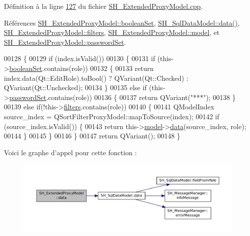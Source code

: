 Définition à la ligne \hyperlink{SH__ExtendedProxyModel_8cpp_source_l00127}{127} du fichier \hyperlink{SH__ExtendedProxyModel_8cpp_source}{S\-H\-\_\-\-Extended\-Proxy\-Model.\-cpp}.



Références \hyperlink{classSH__ExtendedProxyModel_a7dd9cf1dd153b98220d217e9be1f0916}{S\-H\-\_\-\-Extended\-Proxy\-Model\-::boolean\-Set}, \hyperlink{classSH__SqlDataModel_aa4664329d52c2d2cba2bacc42fa1a564}{S\-H\-\_\-\-Sql\-Data\-Model\-::data()}, \hyperlink{classSH__ExtendedProxyModel_a99a5c4c6b9d125c87f048c76d22278d3}{S\-H\-\_\-\-Extended\-Proxy\-Model\-::filters}, \hyperlink{classSH__ExtendedProxyModel_a8c8b8930c6b1abd9bbb1dce1fdc9690b}{S\-H\-\_\-\-Extended\-Proxy\-Model\-::model}, et \hyperlink{classSH__ExtendedProxyModel_a9616e7be442b560e260e1db9034143bc}{S\-H\-\_\-\-Extended\-Proxy\-Model\-::password\-Set}.


\begin{DoxyCode}
00128 \{
00129     \textcolor{keywordflow}{if} (index.isValid())
00130     \{
00131         \textcolor{keywordflow}{if} (this->\hyperlink{classSH__ExtendedProxyModel_a7dd9cf1dd153b98220d217e9be1f0916}{booleanSet}.contains(role))
00132         \{
00133             \textcolor{keywordflow}{return} index.data(Qt::EditRole).toBool() ? QVariant(Qt::Checked) : QVariant(Qt::Unchecked);
00134         \}
00135         \textcolor{keywordflow}{else} \textcolor{keywordflow}{if} (this->\hyperlink{classSH__ExtendedProxyModel_a9616e7be442b560e260e1db9034143bc}{passwordSet}.contains(role))
00136         \{
00137             \textcolor{keywordflow}{return} QVariant(\textcolor{stringliteral}{"***"});
00138         \}
00139         \textcolor{keywordflow}{else} \textcolor{keywordflow}{if}(!this->\hyperlink{classSH__ExtendedProxyModel_a99a5c4c6b9d125c87f048c76d22278d3}{filters}.contains(role))
00140         \{
00141             QModelIndex source\_index = QSortFilterProxyModel::mapToSource(index);
00142             \textcolor{keywordflow}{if} (source\_index.isValid()) \{
00143                 \textcolor{keywordflow}{return} this->\hyperlink{classSH__ExtendedProxyModel_a8c8b8930c6b1abd9bbb1dce1fdc9690b}{model}->\hyperlink{classSH__SqlDataModel_aa4664329d52c2d2cba2bacc42fa1a564}{data}(source\_index, role);
00144             \}
00145         \}
00146     \}
00147     \textcolor{keywordflow}{return} QVariant();
00148 \}
\end{DoxyCode}


Voici le graphe d'appel pour cette fonction \-:\nopagebreak
\begin{figure}[H]
\begin{center}
\leavevmode
\includegraphics[width=350pt]{classSH__ExtendedProxyModel_afbc947efbe1107fc5bf8926c52902a1c_cgraph}
\end{center}
\end{figure}


